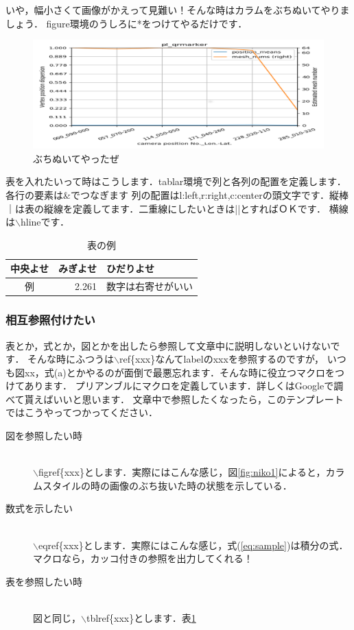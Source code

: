 \documentclass[11pt,twocolumn,a4paper, fleqn, uplatex]{ujarticle}
\def\figref#1{図\ref{#1}}
\def\tblref#1{表\ref{#1}}
\def\eqref#1{式(\ref{#1})}
\begin{document}
いや，幅小さくて画像がかえって見難い！そんな時はカラムをぶちぬいてやりましょう．
figure環境のうしろに*をつけてやるだけです．
\begin{figure}[htbp]
    \centering
    \includegraphics[width=150mm]{img/fig-buchi.png}
    \caption{ぶちぬいてやったぜ}
    \label{fig:buchi}
\end{figure}

表を入れたいって時はこうします．tablar環境で列と各列の配置を定義します．各行の要素は\&でつなぎます
列の配置はl:left,r:right,c:centerの頭文字です．縦棒｜は表の縦線を定義してます．二重線にしたいときは||とすればＯＫです．
横線は$\backslash$hlineです．
\begin{table}[htb]
  \begin{tabular}{|c||r|l|} \hline
    中央よせ & みぎよせ & ひだりよせ \\ \hline \hline
    例 & 2.261 & 数字は右寄せがいい  \\ \hline
  \end{tabular}
  \caption{表の例}
  \label{tbl:ex}
\end{table}

\subsubsection{相互参照付けたい}
表とか，式とか，図とかを出したら参照して文章中に説明しないといけないです．
そんな時にふつうは$\backslash$ref\{xxx\}なんてlabelのxxxを参照するのですが，
いつも図xx，式(a)とかやるのが面倒で最悪忘れます．そんな時に役立つマクロをつけてあります．
プリアンブルにマクロを定義しています．詳しくはGoogleで調べて貰えばいいと思います．
文章中で参照したくなったら，このテンプレートではこうやってつかってください．
\begin{description}
    \item[図を参照したい時]\mbox{}\\ 
        $\backslash$figref\{xxx\}とします．実際にはこんな感じ，\figref{fig:niko1}によると，カラムスタイルの時の画像のぶち抜いた時の状態を示している．
    \item[数式を示したい]\mbox{}\\
        $\backslash$eqref\{xxx\}とします．実際にはこんな感じ，\eqref{eq:sample}は積分の式．マクロなら，カッコ付きの参照を出力してくれる！
    \item[表を参照したい時]\mbox{}\\
        図と同じ，$\backslash$tblref\{xxx\}とします．\tblref{tbl:ex}
\end{description}
\end{document}
